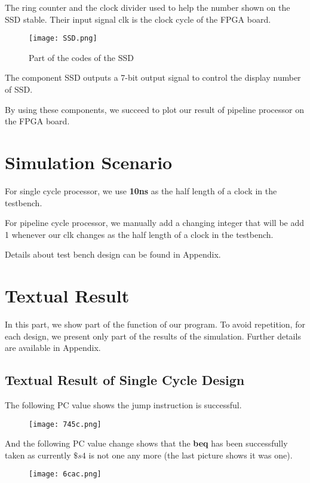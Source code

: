 \documentclass{article}[12pt]
\begin{document}
		The ring counter and the clock divider used to help the number shown on the SSD stable. Their input signal clk is the clock cycle of the FPGA board.
		
		\begin{figure}[H]
			\centering
			\texttt{[image: SSD.png]}
			\caption{Part of the codes of the SSD}
		\end{figure}
		
		 The component SSD outputs a 7-bit output signal to control the display number of SSD.
		 \par By using these components, we succeed to plot our result of pipeline processor on the FPGA board.
		
		
	\section{Simulation Scenario}
	\par For single cycle processor, we use \textbf{10ns} as the half length of a clock in the testbench. 
	\par For pipeline cycle processor, we manually add a changing integer that will be add 1 whenever our clk changes as the half length of a clock in the testbench.
	\par Details about test bench design can be found in Appendix.
	\section{Textual Result}
	In this part, we show part of the function of our program. To avoid repetition, for each design, we present only part of the results of the simulation. Further details are available in Appendix.
	\subsection{Textual Result of Single Cycle Design}
		
		The following PC value shows the jump instruction is successful.
		\begin{figure}[H]
			\centering
			\texttt{[image: 745c.png]}
		\end{figure}
		
		And the following PC value change shows that the \textbf{beq} has been successfully taken as currently $\$s4$ is not one any more (the last picture shows it was one).
		\begin{figure}[H]
			\centering
			\texttt{[image: 6cac.png]}
		\end{figure}
	\newpage
\end{document}
